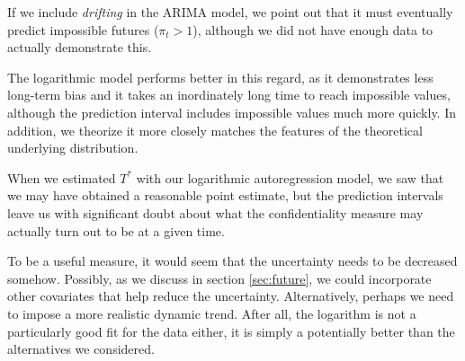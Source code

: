 \documentclass[final,
  11pt,
]{article}
\begin{document}
If we include \emph{drifting} in the ARIMA model, we point out that it
must eventually predict impossible futures ($\pi_t > 1$), although we
did not have enough data to actually demonstrate this.

The logarithmic model performs better in this regard, as it demonstrates
less long-term bias and it takes an inordinately long time to reach impossible
values, although the prediction interval includes impossible values much
more quickly.
In addition, we theorize it more closely matches the features of the theoretical
underlying distribution.

When we estimated $T^*$ with our logarithmic autoregression model,
we saw that we may have obtained a reasonable point estimate, but
the prediction intervals leave us with significant doubt about
what the confidentiality measure may actually turn out to be
at a given time.

To be a useful measure, it would seem that the uncertainty needs
to be decreased somehow.
Possibly, as we discuss in section \ref{sec:future}, we could
incorporate other covariates that help reduce the uncertainty.
Alternatively, perhaps we need to impose a more realistic dynamic trend.
After all, the logarithm is not a particularly good fit for the
data either, it is simply a potentially better than the alternatives
we considered.



\end{document}
